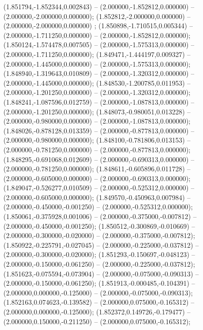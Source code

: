  (1.851794,-1.852344,0.002843) -- (2.000000,-1.852812,0.000000) -- (2.000000,-2.000000,0.000000);
 (1.852812,-2.000000,0.000000) -- (2.000000,-2.000000,0.000000) ;
 (1.850898,-1.710515,0.005344) -- (2.000000,-1.711250,0.000000) -- (2.000000,-1.852812,0.000000);
 (1.850124,-1.574478,0.007505) -- (2.000000,-1.575313,0.000000) -- (2.000000,-1.711250,0.000000);
 (1.849471,-1.444197,0.009327) -- (2.000000,-1.445000,0.000000) -- (2.000000,-1.575313,0.000000);
 (1.848940,-1.319643,0.010809) -- (2.000000,-1.320312,0.000000) -- (2.000000,-1.445000,0.000000);
 (1.848530,-1.200785,0.011953) -- (2.000000,-1.201250,0.000000) -- (2.000000,-1.320312,0.000000);
 (1.848241,-1.087596,0.012759) -- (2.000000,-1.087813,0.000000) -- (2.000000,-1.201250,0.000000);
 (1.848073,-0.980051,0.013228) -- (2.000000,-0.980000,0.000000) -- (2.000000,-1.087813,0.000000);
 (1.848026,-0.878128,0.013359) -- (2.000000,-0.877813,0.000000) -- (2.000000,-0.980000,0.000000);
 (1.848100,-0.781806,0.013153) -- (2.000000,-0.781250,0.000000) -- (2.000000,-0.877813,0.000000);
 (1.848295,-0.691068,0.012609) -- (2.000000,-0.690313,0.000000) -- (2.000000,-0.781250,0.000000);
 (1.848611,-0.605896,0.011728) -- (2.000000,-0.605000,0.000000) -- (2.000000,-0.690313,0.000000);
 (1.849047,-0.526277,0.010509) -- (2.000000,-0.525312,0.000000) -- (2.000000,-0.605000,0.000000);
 (1.849570,-0.450963,0.007984) -- (2.000000,-0.450000,-0.001250) -- (2.000000,-0.525312,0.000000);
 (1.850061,-0.375928,0.001006) -- (2.000000,-0.375000,-0.007812) -- (2.000000,-0.450000,-0.001250);
 (1.850512,-0.300869,-0.010669) -- (2.000000,-0.300000,-0.020000) -- (2.000000,-0.375000,-0.007812);
 (1.850922,-0.225791,-0.027045) -- (2.000000,-0.225000,-0.037812) -- (2.000000,-0.300000,-0.020000);
 (1.851293,-0.150697,-0.048123) -- (2.000000,-0.150000,-0.061250) -- (2.000000,-0.225000,-0.037812);
 (1.851623,-0.075594,-0.073904) -- (2.000000,-0.075000,-0.090313) -- (2.000000,-0.150000,-0.061250);
 (1.851913,-0.000485,-0.104391) -- (2.000000,0.000000,-0.125000) -- (2.000000,-0.075000,-0.090313);
 (1.852163,0.074623,-0.139582) -- (2.000000,0.075000,-0.165312) -- (2.000000,0.000000,-0.125000);
 (1.852372,0.149726,-0.179477) -- (2.000000,0.150000,-0.211250) -- (2.000000,0.075000,-0.165312);

